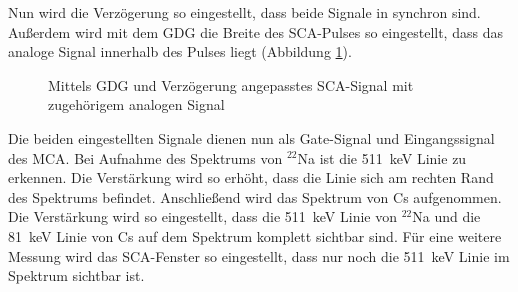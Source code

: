 Nun wird die Verzögerung so eingestellt, dass beide Signale in synchron sind. Außerdem wird mit dem GDG die Breite des SCA-Pulses so eingestellt, dass das analoge Signal innerhalb des Pulses liegt (Abbildung \ref{fig:zeitliche_breite_sca_und_analog}).

\begin{figure}[h]
  \centering
  \caption{Mittels GDG und Verzögerung angepasstes SCA-Signal mit zugehörigem analogen Signal}
  \label{fig:zeitliche_breite_sca_und_analog}
\end{figure}
Die beiden eingestellten Signale dienen nun als Gate-Signal und Eingangssignal des MCA. Bei Aufnahme des Spektrums von $^{22}$Na ist die \SI{511}{\kilo\electronvolt} Linie zu erkennen. Die Verstärkung wird so erhöht, dass die Linie sich am rechten Rand des Spektrums befindet. Anschließend wird das Spektrum von Cs aufgenommen. Die Verstärkung wird so eingestellt, dass die \SI{511}{\kilo\electronvolt} Linie von $^{22}$Na und die \SI{81}{\kilo\electronvolt} Linie von Cs auf dem Spektrum komplett sichtbar sind. Für eine weitere Messung wird das SCA-Fenster so eingestellt, dass nur noch die \SI{511}{\kilo\electronvolt} Linie im Spektrum sichtbar ist. 
\\

